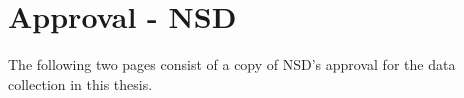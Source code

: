 \chapter{Approval - NSD}
The following two pages consist of a copy of NSD's approval for the data collection in this thesis.

